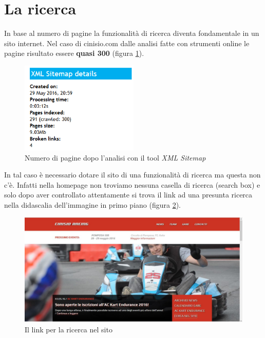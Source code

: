 
\section{La ricerca}
	In base al numero di pagine la funzionalità di ricerca diventa fondamentale in un sito internet. Nel caso di cinisio.com dalle analisi fatte con strumenti online le pagine risultato essere \textbf{quasi 300} (figura \ref{fig:NumeroDiPagine}).
	
	
	\begin{figure} [h]
		\centering
		\includegraphics[width=0.5\textwidth]{images/NumeroDiPagine}
		\caption{Numero di pagine dopo l'analisi con il tool \textit{XML Sitemap}}
		\label{fig:NumeroDiPagine}
	\end{figure}
	
	In tal caso è necessario dotare il sito di una funzionalità di ricerca ma questa non c'è. Infatti nella homepage non troviamo nessuna casella di ricerca (search box) e solo dopo aver controllato attentamente si trova il link ad una presunta ricerca nella didascalia dell'immagine in primo piano (figura \ref{fig:Homepage-Ricerca}).
	
	\begin{figure} [h]
		\centering
		\includegraphics[width=\textwidth]{images/SearchOption_WhereItIs}
		\caption{Il link per la ricerca nel sito}
		\label{fig:Homepage-Ricerca}
	\end{figure}
	
